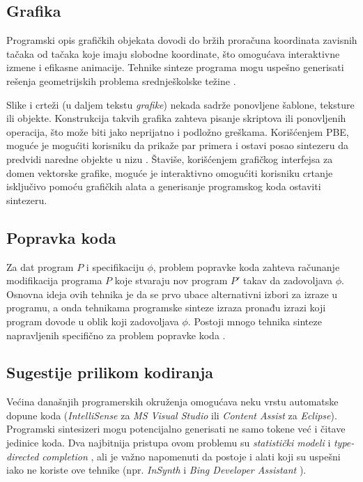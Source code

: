 \subsection{Grafika}
\label{subsec:Grafika}

Programski opis grafičkih objekata dovodi do bržih proračuna koordinata zavisnih tačaka od tačaka koje imaju slobodne koordinate, što omogućava interaktivne izmene i efikasne animacije. Tehnike sinteze programa mogu uspešno generisati rešenja geometrijskih problema srednješkolske težine \cite{SynthesizingGeometryConstructions}.

Slike i crteži (u daljem tekstu \emph{grafike}) nekada sadrže ponovljene šablone, teksture ili objekte. Konstrukcija takvih grafika zahteva pisanje skriptova ili ponovljenih operacija, što može biti jako neprijatno i podložno greškama. Korišćenjem PBE, moguće je mogućiti korisniku da prikaže par primera i ostavi posao sintezeru da predvidi naredne objekte u nizu \cite{Backpropagation}. Štaviše, korišćenjem grafičkog interfejsa za domen vektorske grafike, moguće je interaktivno omogućiti korisniku crtanje isključivo pomoću grafičkih alata a generisanje programskog koda ostaviti sintezeru.


\subsection{Popravka koda}
\label{subsec:PopravkaKoda}

Za dat program $P$ i specifikaciju $\phi$, problem popravke koda zahteva računanje modifikacija programa $P$ koje stvaraju nov program $P'$ takav da zadovoljava $\phi$. Osnovna ideja ovih tehnika je da se prvo ubace alternativni izbori za izraze u programu, a onda tehnikama programske sinteze izraza pronađu izrazi koji program dovode u oblik koji zadovoljava $\phi$. Postoji mnogo tehnika sinteze napravljenih specifično za problem popravke koda \cite{Qlose, ProgramRepairAsAGame}.


\subsection{Sugestije prilikom kodiranja}
\label{subsec:SugestijePrilikomKodiranja}

Većina današnjih programerskih okruženja omogućava neku vrstu automatske dopune koda (\emph{IntelliSense} za \emph{MS Visual Studio} ili \emph{Content Assist} za \emph{Eclipse}). Programski sintesizeri mogu potencijalno generisati ne samo tokene već i čitave jedinice koda. Dva najbitnija pristupa ovom problemu su \emph{statistički modeli} \cite{CCWSLM} i \emph{type-directed completion} \cite{TDCOPE}, ali je važno napomenuti da postoje i alati koji su uspešni iako ne koriste ove tehnike (npr. \emph{InSynth} \cite{IS} i \emph{Bing Developer Assistant} \cite{BDA}).


